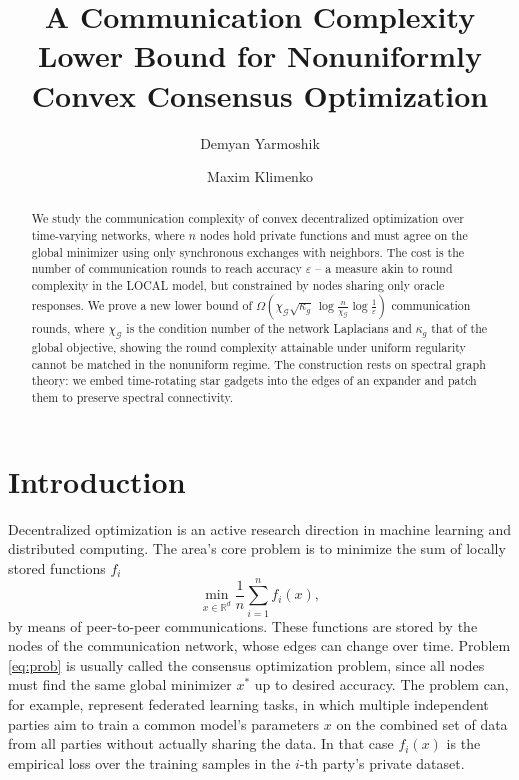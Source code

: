 \documentclass[a4paper,USenglish,cleveref, autoref, thm-restate]{lipics-v2021}
\title{A Communication Complexity Lower Bound for Nonuniformly Convex Consensus Optimization}
\author{Demyan Yarmoshik}{MIRAI, Russia}{yarmoshik.d@miriai.org}{https://orcid.org/0000-0003-1912-1040}{}%
\author{Maxim Klimenko}{MIPT, Russia}{klimkomx@gmail.com}{}{}
\newcommand{\R}{{\mathbb R}}
\begin{document}
\maketitle

\begin{abstract}
We study the communication complexity of convex decentralized optimization over time-varying networks, where $n$ nodes hold private functions and must agree on the global minimizer using only synchronous exchanges with neighbors.
The cost is the number of communication rounds to reach accuracy $\varepsilon$ -- a measure akin to round complexity in the LOCAL model, but constrained by nodes sharing only oracle responses.
We prove a new lower bound of $\Omega\!\left(\chi_{\mathcal G} \sqrt{\kappa_g}\,\log\frac{n}{\chi_{\mathcal G}}\log\frac1\varepsilon\right)$ communication rounds, where $\chi_{\mathcal G}$ is the condition number of the network Laplacians and $\kappa_g$ that of the global objective, showing the round complexity attainable under uniform regularity cannot be matched in the nonuniform regime.
The construction rests on spectral graph theory: we embed time-rotating star gadgets into the edges of an expander and patch them to preserve spectral connectivity.
\end{abstract}

\section{Introduction}
Decentralized optimization is an active research direction in machine learning and distributed computing.
The area's core problem is to minimize the sum of locally stored functions $f_i$ 
\begin{equation}\label{eq:prob}
    \min_{x\in \R^d} \frac1n \sum_{i=1}^n f_i(x),
\end{equation}
by means of peer-to-peer communications.
These functions are stored by the nodes of the communication network, whose edges can change over time.
Problem \eqref{eq:prob} is usually called the consensus optimization problem, since all nodes must find the same global minimizer $x^*$ up to desired accuracy. 
The problem can, for example, represent federated learning tasks, in which multiple independent parties aim to train a common model's parameters $x$ on the combined set of data from all parties without actually sharing the data. 
In that case $f_i(x)$ is the empirical loss over the training samples in the $i$-th party's private dataset.%
\end{document}
